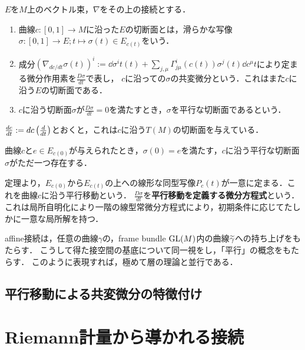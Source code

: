 \documentclass[uplatex,dvipdfmx]{jsreport}
\begin{document}
\begin{definition}
    $E$を$M$上のベクトル束，$\nabla$をその上の接続とする．
    \begin{enumerate}
        \item 曲線$c:[0,1]\to M$に沿った$E$の切断面とは，滑らかな写像$\sigma:[0,1]\to E;t\mapsto \sigma(t)\in E_{c(t)}$をいう．
        \item 成分$(\nabla_{dc/dt}\sigma(t))^i:=\dd{\sigma^i}{t}(t)+\sum_{j,\mu}\Gamma^i_{j\mu}(c(t))\sigma^j(t)\dd{c^\mu}{t}$により定まる微分作用素を$\frac{D\sigma}{dt}$で表し，
        $c$に沿っての$\sigma$の共変微分という．これはまた$c$に沿う$E$の切断面である．
        \item $c$に沿う切断面$\sigma$が$\frac{D\sigma}{dt}=0$を満たすとき，$\sigma$を平行な切断面であるという．
    \end{enumerate}
\end{definition}
\begin{example}
    $\frac{d c}{d t}:=dc\left(\frac{d }{d t}\right)$とおくと，これは$c$に沿う$T(M)$の切断面を与えている．
\end{example}

\begin{theorem}
    曲線$c$と$e\in E_{c(0)}$が与えられたとき，$\sigma(0)=e$を満たす，$c$に沿う平行な切断面$\sigma$がただ一つ存在する．
\end{theorem}

\begin{definition}
    定理より，$E_{c(0)}$から$E_{c(t)}$の上への線形な同型写像$P_c(t)$が一意に定まる．これを曲線$c$に沿う平行移動という．
    $\frac{D\sigma}{dt}$を\textbf{平行移動を定義する微分方程式}という．
    これは局所自明化により一階の線型常微分方程式により，初期条件に応じてたしかに一意な局所解を持つ．
\end{definition}

\begin{remarks}
    affine接続は，任意の曲線$\gamma$の，frame bundle $\mathrm{GL}(M)$内の曲線$\widetilde{\gamma}$への持ち上げをもたらす．
    こうして得た接空間の基底について同一視をし，「平行」の概念をもたらす．
    このように表現すれば，極めて層の理論と並行である．
\end{remarks}

\subsection{平行移動による共変微分の特徴付け}

\section{Riemann計量から導かれる接続}
\end{document}
